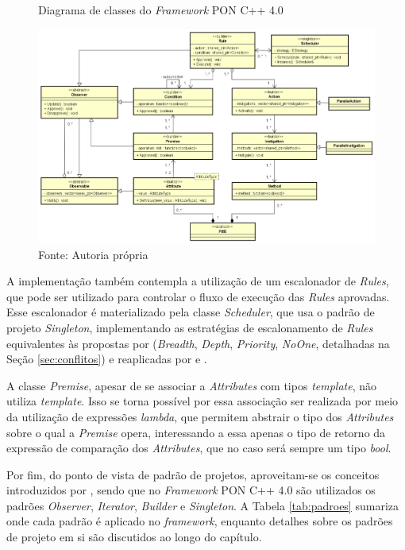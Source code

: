 \begin{figure}[!htb]
    \centering
    \caption{Diagrama de classes do \textit{Framework} PON C++ 4.0}
    \includegraphics[width=\textwidth]{../figures/astah_nop4.png}
    \smallskip
    \caption*{Fonte: Autoria própria}
    \label{fig:class_fw4}
\end{figure}

\FloatBarrier

A implementação também contempla a utilização de um escalonador de
\textit{Rules}, que pode ser utilizado para controlar o fluxo de execução das
\textit{Rules} aprovadas. Esse escalonador é materializado pela classe
\textit{Scheduler}, que usa o padrão de projeto \textit{Singleton},
implementando as estratégias de escalonamento de \textit{Rules} equivalentes às
propostas por  (\textit{Breadth},
\textit{Depth}, \textit{Priority}, \textit{NoOne}, detalhadas na Seção
\ref{sec:conflitos}) e reaplicadas por  e
.

A classe \textit{Premise}, apesar de se associar a \textit{Attributes} com tipos
\textit{template}, não utiliza \textit{template}. Isso se torna possível por
essa associação ser realizada por meio da utilização de expressões
\textit{lambda}, que permitem abstrair o tipo dos \textit{Attributes} sobre o
qual a \textit{Premise} opera, interessando a essa apenas o tipo de retorno da
expressão de comparação dos \textit{Attributes}, que no caso será sempre um tipo
\textit{bool}.

Por fim, do ponto de vista de padrão de projetos, aproveitam-se os conceitos
introduzidos por , sendo que no \textit{Framework}
PON C++ 4.0 são utilizados os padrões \textit{Observer}, \textit{Iterator},
\textit{Builder} e \textit{Singleton}. A Tabela \ref{tab:padroes} sumariza onde
cada padrão é aplicado no \textit{framework}, enquanto detalhes sobre os padrões
de projeto em si são discutidos ao longo do capítulo.

